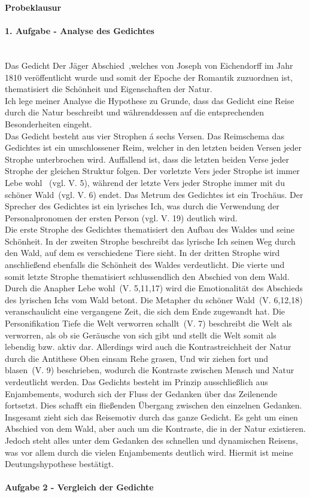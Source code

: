 \documentclass[11pt,a4paper]{report}
\begin{document}
	\centering
	\LARGE
	\textbf{Probeklausur}
	\normalsize
	\leftskip
	
	\paragraph{1. Aufgabe - Analyse des Gedichtes} \mbox{} \\
	Das Gedicht \dq Der Jäger Abschied\dq\ ,welches von Joseph von Eichendorff im Jahr 1810 veröffentlicht wurde und somit der Epoche der Romantik zuzuordnen ist, thematisiert die Schönheit und Eigenschaften der Natur. \\
	Ich lege meiner Analyse die Hypothese zu Grunde, dass das Gedicht eine Reise durch die Natur beschreibt und währenddessen auf die entsprechenden Besonderheiten eingeht. \\
	Das Gedicht besteht aus vier Strophen á sechs Versen.
	Das Reimschema das Gedichtes ist ein umschlossener Reim, welcher in den letzten beiden Versen jeder Strophe unterbrochen wird.
	Auffallend ist, dass die letzten beiden Verse jeder Strophe der gleichen Struktur folgen.
	Der vorletzte Vers jeder Strophe ist immer \dq Lebe wohl \dq\ (vgl. V. 5), während der letzte Vers jeder Strophe immer mit \dq du schöner Wald\dq\ (vgl. V. 6) endet.
	Das Metrum des Gedichtes ist ein Trochäus.
	Der Sprecher des Gedichtes ist ein lyrisches Ich, was durch die Verwendung der Personalpronomen der ersten Person (vgl. V. 19)  deutlich wird. \\
	Die erste Strophe des Gedichtes thematisiert den Aufbau des Waldes und seine Schönheit.
	In der zweiten Strophe beschreibt das lyrische Ich seinen Weg durch den Wald, auf dem es verschiedene Tiere sieht.
	In der dritten Strophe wird anschließend ebenfalls die Schönheit des Waldes verdeutlicht.
	Die vierte und somit letzte Strophe thematisiert schlussendlich den Abschied von dem Wald. \\
	Durch die Anapher \dq Lebe wohl\dq\ (V. 5,11,17) wird die Emotionalität des Abschieds des lyrischen Ichs vom Wald betont.
	Die Metapher \dq du schöner Wald\dq\ (V. 6,12,18) veranschaulicht eine vergangene Zeit, die sich dem Ende zugewandt hat.
	Die Personifikation \dq Tiefe die Welt verworren schallt\dq\ (V. 7) beschreibt die Welt als verworren, als ob sie Geräusche von sich gibt und stellt die Welt somit als lebendig bzw. aktiv dar.
	Allerdings wird auch die Kontrastreichheit der Natur durch die Antithese \dq Oben einsam Rehe grasen, Und wir ziehen fort und blasen\dq\ (V. 9) beschrieben, wodurch die Kontraste zwischen Mensch und Natur verdeutlicht werden.
	Das Gedichts besteht im Prinzip ausschließlich aus Enjambements, wodurch sich der Fluss der Gedanken über das Zeilenende fortsetzt.
	Dies schafft ein fließenden Übergang zwischen den einzelnen Gedanken. \\
	Insgesamt zieht sich das Reisemotiv durch das ganze Gedicht.
	Es geht um einen Abschied von dem Wald, aber auch um die Kontraste, die in der Natur existieren.
	Jedoch steht alles unter dem Gedanken des schnellen und dynamischen Reisens, was vor allem durch die vielen Enjambements deutlich wird.
	Hiermit ist meine Deutungshypothese bestätigt.
	
	\paragraph{Aufgabe 2 - Vergleich der Gedichte} \mbox{} \\

	
\end{document}
